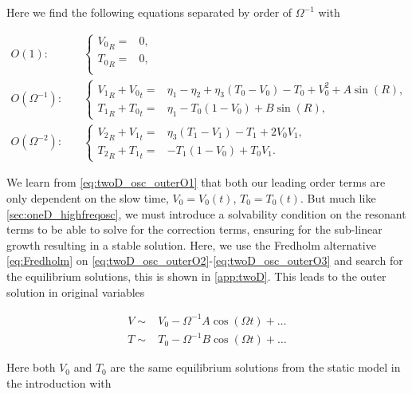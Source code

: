 Here we find the following equations separated by order of $\Omega^{-1}$ with

\begin{align}
\label{eq:twoD_osc_outerO1}
O(1):\quad & \begin{cases}
	{V_0}_R =& 0, \\
	{T_0}_R =& 0,\\
\end{cases}\\
\label{eq:twoD_osc_outerO2}
O(\Omega^{-1}):\quad & \begin{cases}
	{V_1}_R+{V_0}_t = & \eta_1-\eta_2+\eta_3(T_0-V_0)-T_0+V_0^2+A\sin(R),\\
	 {T_1}_R +{T_0}_t =& \eta_1-T_0(1-V_0)+B\sin(R),
\end{cases}\\
\label{eq:twoD_osc_outerO3}
O(\Omega^{-2}):\quad & \begin{cases}
	{V_2}_R+{V_1}_t = & \eta_3(T_1-V_1)-T_1+2V_0V_1,\\
	 {T_2}_R +{T_1}_t =& -T_1(1-V_0)+T_0V_1.
\end{cases}
\end{align}

We learn from \eqref{eq:twoD_osc_outerO1} that both our leading order terms are only dependent on the slow time, $V_0=V_0(t)$, $T_0=T_0(t)$. But much like \autoref{sec:oneD_highfreqosc}, we must introduce a solvability condition on the resonant terms to be able to solve for the correction terms, ensuring for the sub-linear growth resulting in a stable solution. Here, we use the Fredholm alternative \eqref{eq:Fredholm} on \eqref{eq:twoD_osc_outerO2}-\eqref{eq:twoD_osc_outerO3} and search for the equilibrium solutions, this is shown in \autoref{app:twoD}. This leads to the outer solution in original variables

\begin{equation}\label{eq:twoD_osc_outersoln}
\begin{aligned}
V\sim& V_0-\Omega^{-1} A\cos(\Omega t)+\dots\\
T\sim& T_0-\Omega^{-1} B\cos(\Omega t)+\ldots%
\end{aligned}
\end{equation}

Here both $V_0$ and $T_0$ are the same equilibrium solutions from the static model in the introduction with

